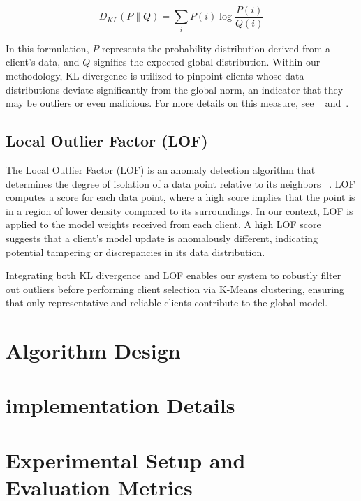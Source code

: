 \[
    D_{KL}(P \parallel Q) = \sum_{i} P(i) \log\frac{P(i)}{Q(i)}
\]

In this formulation, \(P\) represents the probability distribution derived from
a client's data, and \(Q\) signifies the expected global distribution. Within
our methodology, KL divergence is utilized to pinpoint clients whose data
distributions deviate significantly from the global norm, an indicator that
they may be outliers or even malicious. For more details on this measure, see
~\cite{cover1991elements} and~\cite{mcdonald2016measure}.

\subsection{Local Outlier Factor (LOF)}
The Local Outlier Factor (LOF) is an anomaly detection algorithm that
determines the degree of isolation of a data point relative to its neighbors
~\cite{breunig2000lof}. LOF computes a score for each data point, where a high
score implies that the point is in a region of lower density compared to its
surroundings. In our context, LOF is applied to the model weights received from
each client. A high LOF score suggests that a client's model update is
anomalously different, indicating potential tampering or discrepancies in its
data distribution.

Integrating both KL divergence and LOF enables our system to robustly filter
out outliers before performing client selection via K-Means clustering,
ensuring that only representative and reliable clients contribute to the global
model.
\section{Algorithm Design}

\section{implementation Details}

\section{Experimental Setup and Evaluation Metrics}


